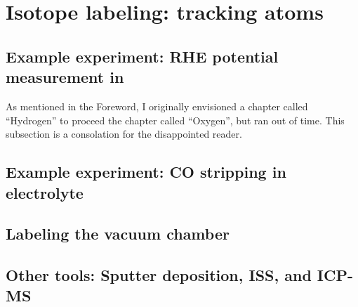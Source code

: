 \section{Isotope labeling: tracking atoms}




\subsection{Example experiment: RHE potential measurement in }\label{subsec:isotope_RHE}
As mentioned in the Foreword, I originally envisioned a chapter called ``Hydrogen'' to proceed the chapter called ``Oxygen'', but ran out of time. This subsection is a consolation for the disappointed reader.

\subsection{Example experiment: CO stripping in  electrolyte}\label{subsec:isotope_CO2}


\subsection{Labeling the vacuum chamber}\label{subsec:vacuum_transport}


\subsection{Other tools: Sputter deposition, ISS, and ICP-MS}\label{subsec:other_tools}
